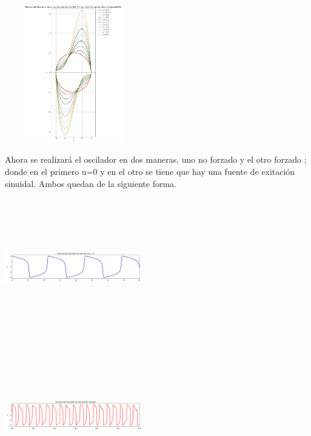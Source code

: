 \documentclass{article}
\begin{document}
\begin{center}
    \includegraphics[width=6cm, height=6cm]{Van2.png}
\end{center}

Ahora se realizará el oscilador en dos maneras, uno no forzado y el otro forzado ; donde en el primero u=0 y en el otro se tiene que hay una fuente de exitación sinuidal. Ambos quedan de la siguiente forma.

\begin{center}
    \includegraphics[width=6cm, height=6cm]{Van3.png}
\end{center}

\begin{center}
    \includegraphics[width=6cm, height=6cm]{Van4.png}
\end{center}
\end{document}
